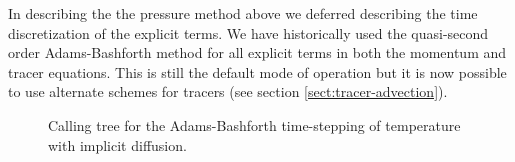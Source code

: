 In describing the the pressure method above we deferred describing the
time discretization of the explicit terms. We have historically used
the quasi-second order Adams-Bashforth method for all explicit terms
in both the momentum and tracer equations. This is still the default
mode of operation but it is now possible to use alternate schemes for
tracers (see section \ref{sect:tracer-advection}).

\begin{figure}
\begin{center}  \end{center}
\caption{
Calling tree for the Adams-Bashforth time-stepping of temperature with
implicit diffusion.}
\label{fig:call-tree-adams-bashforth}
\end{figure}

